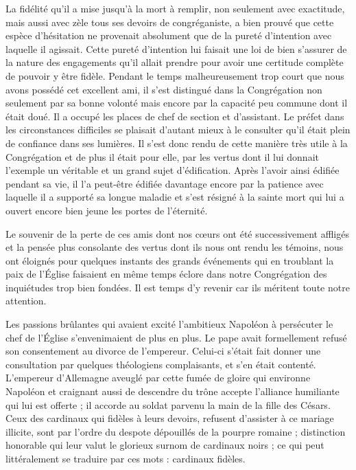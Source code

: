 La fidélité qu'il a mise jusqu'à la mort à remplir, non seulement avec exactitude, mais aussi avec zèle tous ses devoirs de congréganiste, a bien prouvé que cette espèce d'hésitation ne provenait absolument que de la pureté d'intention avec laquelle il agissait. Cette pureté d'intention lui faisait une loi de bien s'assurer de la nature des engagements qu'il allait prendre pour avoir une certitude complète de pouvoir y être fidèle. Pendant le temps malheureusement trop court que nous avons possédé cet excellent ami, il s'est distingué dans la Congrégation non seulement par sa bonne volonté mais encore par la capacité peu commune dont il était doué. Il a occupé les places de chef de section et d'assistant. Le préfet dans les circonstances difficiles se plaisait d'autant mieux à le consulter qu'il était plein de confiance dans ses lumières. Il s'est donc rendu de cette manière très utile à la Congrégation et de plus il était pour elle, par les vertus dont il lui donnait l'exemple un véritable et un grand sujet d'édification. Après l'avoir ainsi édifiée pendant sa vie, il l'a peut-être édifiée davantage encore par la patience avec laquelle il a supporté sa longue maladie et s'est résigné à la sainte mort qui lui a ouvert encore bien jeune les portes de l'éternité.

Le souvenir de la perte de ces amis dont nos cœurs ont été successivement affligés et la pensée plus consolante des vertus dont ils nous ont rendu les témoins, nous ont éloignés pour quelques instants des grands événements qui en troublant la paix de l'Église faisaient en même temps éclore dans notre Congrégation des inquiétudes trop bien fondées. Il est temps d'y revenir car ils méritent toute notre attention.

Les passions brûlantes qui avaient excité l'ambitieux Napoléon à persécuter le chef de l'Église s'envenimaient de plus en plus. Le pape avait formellement refusé son consentement au divorce de l'empereur. Celui-ci s'était fait donner une consultation par quelques théologiens complaisants, et s’en était contenté. L'empereur d'Allemagne aveuglé par cette fumée de gloire qui environne Napoléon et craignant aussi de descendre du trône accepte l'alliance humiliante qui lui est offerte ; il accorde au soldat parvenu la main de la fille des Césars. Ceux des cardinaux qui fidèles à leurs devoirs, refusent d'assister à ce mariage illicite, sont par l'ordre du despote dépouillés de la pourpre romaine ; distinction honorable qui leur valut le glorieux surnom de cardinaux noirs ; ce qui peut littéralement se traduire par ces mots : cardinaux fidèles.

